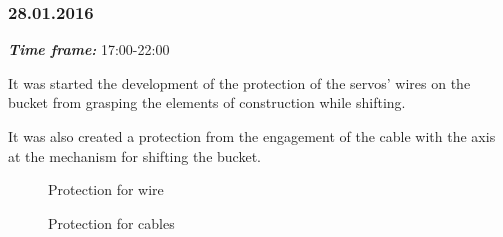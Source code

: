 \subsubsection{28.01.2016}
\textit{\textbf{Time frame:}} 17:00-22:00 

It was started the development of the protection of the servos' wires on the bucket from grasping the elements of construction while shifting.

It was also created a protection from the engagement of the cable with the axis at the mechanism for shifting the bucket.

\begin{figure}[H]
	\begin{minipage}[h]{0.47\linewidth}
		\caption{Protection for wire}
	\end{minipage}
	\hfill
	\begin{minipage}[h]{0.47\linewidth}
		\caption{Protection for cables}
	\end{minipage}
\end{figure}

